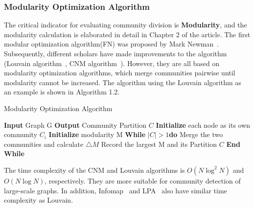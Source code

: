 \documentclass[ %
                    author={Tengyao Tu},
                supervisor={Dr. James Pope},
                    degree={MSc},
                     title={A New Perspective on Graph Community Detection: Combining Traditional Methods with Deep Learning Approaches},
                  subtitle={Applying to Telecom Networks and Diverse Datasets},
                      type={},
                      year={2024}]{dissertation}
\begin{document}
\subsubsection{Modularity Optimization Algorithm}
The critical indicator for evaluating community division is \textbf{Modularity}, and the modularity calculation is elaborated in detail in Chapter 2 of the article. The first modular optimization algorithm(FN) was proposed by Mark Newman~\cite{newman2004fast}. Subsequently, different scholars have made improvements to the algorithm (Louvain algorithm~\cite{blondel2008fast}, CNM algorithm~\cite{clauset2004finding}). However, they are all based on modularity optimization algorithms, which merge communities pairwise until modularity cannot be increased. The algorithm using the Louvain algorithm as an example is shown in Algorithm 1.2.
\begin{algorithm}[ht!]
\caption{Modularity Optimization Algorithm}
\begin{framedalgorithm}[ht!]
    \State \textbf{Input} Graph G \newline
    \State \textbf{Output} Community Partition $C$\newline
   \State \textbf{Initialize} each node as its own community $C_{i}$\newline
    \State \textbf{Initialize} modularity M\newline
    \State \textbf{While} $|C| > 1$\textbf{do}\newline
    \State \phantom{hold} Merge the two communities and calculate $\triangle M$\newline
    \State \phantom{hold} Record the largest M and its Partition $C$\newline
    \State \textbf{End While} \newline
\end{framedalgorithm}
\end{algorithm}
The time complexity of the CNM and Louvain algorithms is $O(N \log^2 N)$ and $O(N \log N)$, respectively. They are more suitable for community detection of large-scale graphs. In addition, Infomap~\cite{rosvall2008maps} and LPA~\cite{garza2019community} also have similar time complexity as Louvain.
\end{document}
